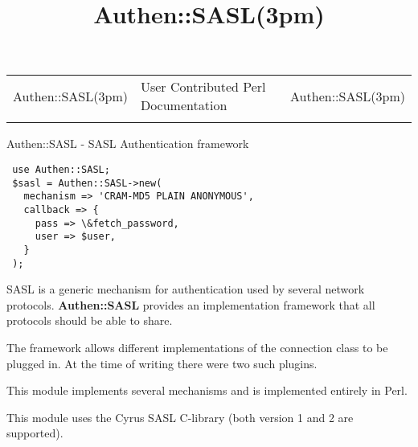 \documentclass[]{article}
\title{Authen::SASL(3pm)}
\author{}
\date{}
\let\realtextbf=\textbf
\renewcommand{\textbf}[1]{\textcolor{boldcolor}{\realtextbf{#1}}}
\begin{document}
\maketitle

\begin{longtable}[c]{@{}lll@{}}
\toprule\addlinespace
Authen::SASL(3pm) & User Contributed Perl Documentation &
Authen::SASL(3pm)
\\\addlinespace
\bottomrule
\end{longtable}


Authen::SASL - SASL Authentication framework


\begin{verbatim}
 use Authen::SASL;
 $sasl = Authen::SASL->new(
   mechanism => 'CRAM-MD5 PLAIN ANONYMOUS',
   callback => {
     pass => \&fetch_password,
     user => $user,
   }
 );
\end{verbatim}


SASL is a generic mechanism for authentication used by several network
protocols. \textbf{Authen::SASL} provides an implementation framework
that all protocols should be able to share.

The framework allows different implementations of the connection class
to be plugged in. At the time of writing there were two such plugins.

\begin{description}
\itemsep1pt\parskip0pt
\item[Authen::SASL::Perl]
This module implements several mechanisms and is implemented entirely in
Perl.
\end{description}

\begin{description}
\itemsep1pt\parskip0pt
\item[Authen::SASL::XS]
This module uses the Cyrus SASL C-library (both version 1 and 2 are
supported).
\end{description}
\end{document}
